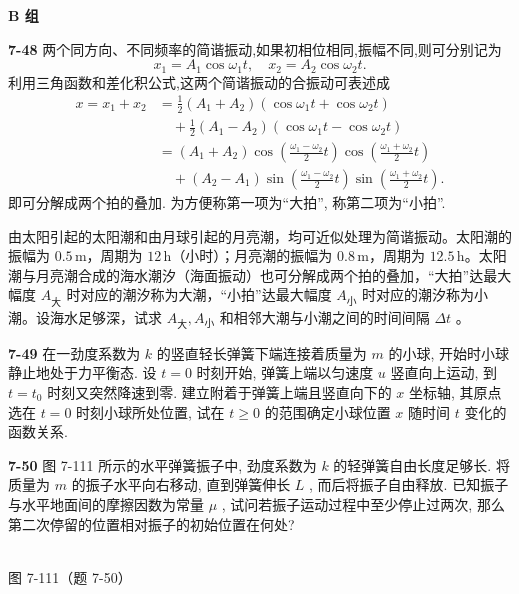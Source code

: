 \newpage

\begin{center}\textbf{B 组}\end{center}

\textbf{7-48} 两个同方向、不同频率的简谐振动,如果初相位相同,振幅不同,则可分别记为
\[
x _ {1} = A _ {1} \cos \omega_ {1} t, \quad x _ {2} = A _ {2} \cos \omega_ {2} t.
\]
利用三角函数和差化积公式,这两个简谐振动的合振动可表述成
\[
\begin{aligned}
x=x_1+x_2
 &=\frac12(A_1+A_2)(\cos\omega_1t+\cos\omega_2t)\\
 &\quad+\frac12(A_1-A_2)(\cos\omega_1t-\cos\omega_2t)\\
 &=(A_1+A_2)\cos\left(\frac{\omega_1-\omega_2}{2}t\right)
       \cos\left(\frac{\omega_1+\omega_2}{2}t\right)\\
 &\quad+(A_2-A_1)\sin\left(\frac{\omega_1-\omega_2}{2}t\right)
       \sin\left(\frac{\omega_1+\omega_2}{2}t\right).
\end{aligned}
\]
即可分解成两个拍的叠加. 为方便称第一项为“大拍”, 称第二项为“小拍”.

由太阳引起的太阳潮和由月球引起的月亮潮，均可近似处理为简谐振动。太阳潮的振幅为 $0.5\,\mathrm m$，周期为 $12\,\mathrm h$（小时）；月亮潮的振幅为 $0.8\,\mathrm m$，周期为 $12.5\,\mathrm h$。太阳潮与月亮潮合成的海水潮汐（海面振动）也可分解成两个拍的叠加，“大拍”达最大幅度 $A_{\text{大}}$ 时对应的潮汐称为大潮，“小拍”达最大幅度 $A_{\text{小}}$ 时对应的潮汐称为小潮。设海水足够深，试求 $A_{\text{大}}, A_{\text{小}}$ 和相邻大潮与小潮之间的时间间隔 $\Delta t$ 。

\newpage

\textbf{7-49} 在一劲度系数为 $k$ 的竖直轻长弹簧下端连接着质量为 $m$ 的小球, 开始时小球静止地处于力平衡态. 设 $t = 0$ 时刻开始, 弹簧上端以匀速度 $u$ 竖直向上运动, 到 $t = t_0$ 时刻又突然降速到零. 建立附着于弹簧上端且竖直向下的 $x$ 坐标轴, 其原点选在 $t = 0$ 时刻小球所处位置, 试在 $t \geqslant 0$ 的范围确定小球位置 $x$ 随时间 $t$ 变化的函数关系.

\newpage

\textbf{7-50} 图 7-111 所示的水平弹簧振子中, 劲度系数为 $k$ 的轻弹簧自由长度足够长. 将质量为 $m$ 的振子水平向右移动, 直到弹簧伸长 $L$ , 而后将振子自由释放. 已知振子与水平地面间的摩擦因数为常量 $\mu$ , 试问若振子运动过程中至少停止过两次, 那么第二次停留的位置相对振子的初始位置在何处?

\begin{center}
\resizebox{0.46\textwidth}{!}{}\\[4pt]
{\small 图 7-111（题 7-50）}
\end{center}

